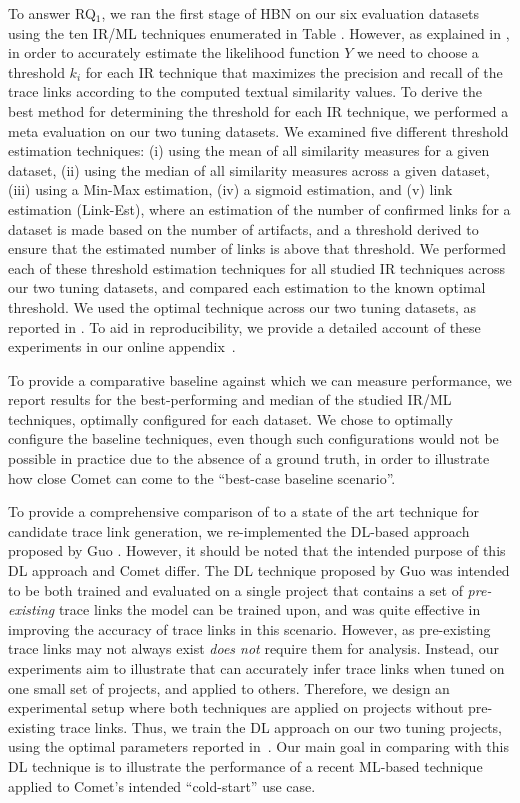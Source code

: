 To answer RQ$_1$, we ran the first stage of \Comets HBN on our six evaluation datasets using the ten IR/ML techniques enumerated in Table . However, as explained in , in order to accurately estimate the likelihood function $Y$ we need to choose a threshold $k_i$ for each IR technique that maximizes the precision and recall of the trace links according to the computed textual similarity values. To derive the best method for determining the threshold for each IR technique, we performed a meta evaluation on our two tuning datasets. We examined five different threshold estimation techniques: (i) using the mean of all similarity measures for a given dataset, (ii) using the median of all similarity measures across a given dataset, (iii) using a Min-Max estimation, (iv) a sigmoid estimation, and (v) link estimation (Link-Est), where an estimation of the number of confirmed links for a dataset is made based on the number of artifacts, and a threshold derived to ensure that the estimated number of links is above that threshold.  We performed each of these threshold estimation techniques for all studied IR techniques across our two tuning datasets, and compared each estimation to the known optimal threshold. We used the optimal technique across our two tuning datasets, as reported in . To aid in reproducibility, we provide a detailed account of these experiments in our online appendix~\citep{appendix}.

To provide a comparative baseline against which we can measure \Comets performance, we report results for the best-performing and median of the studied IR/ML techniques, optimally configured for each dataset. We chose to optimally configure the baseline techniques, even though such configurations would not be possible in practice due to the absence of a ground truth, in order to illustrate how close Comet can come to the ``best-case baseline scenario''. 

To provide a comprehensive comparison of \Comet to a state of the art technique for candidate trace link generation, we re-implemented the DL-based approach proposed by Guo \etal\citep{Guo:ICSE'17}. However, it should be noted that the intended purpose of this DL approach and Comet differ. The DL technique proposed by Guo \etal was intended to be both trained and evaluated on a single project that contains a set of \textit{pre-existing} trace links the model can be trained upon, and was quite effective in improving the accuracy of trace links in this scenario. However, as pre-existing trace links may not always exist \Comet \textit{does not} require them for analysis. Instead, our experiments aim to illustrate that \Comet can accurately infer trace links when tuned on one small set of projects, and applied to others. Therefore, we design an experimental setup where both techniques are applied on projects without pre-existing trace links. Thus, we train the DL approach on our two tuning projects, using the optimal parameters reported in~\citep{Guo:ICSE'17}. Our main goal in comparing with this DL technique is to illustrate the performance of a recent ML-based technique applied to Comet's intended ``cold-start'' use case.

